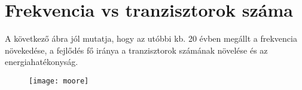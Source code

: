 \section{Frekvencia vs tranzisztorok száma}
A következő ábra jól mutatja, hogy az utóbbi kb. 20 évben megállt a frekvencia növekedése, a fejlődés fő iránya a tranzisztorok számának növelése és az energiahatékonyság.
\begin{figure}[H]
    \texttt{[image: moore]}
    \centering
    \label{fig:moore}
\end{figure}